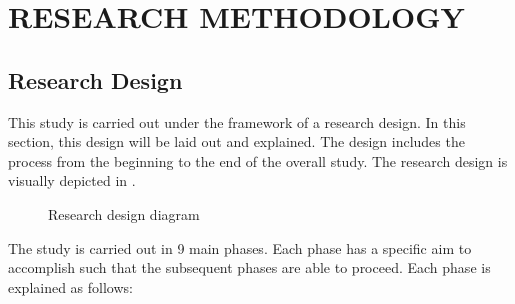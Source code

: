 \chapter{RESEARCH METHODOLOGY}\label{sec:research_methodology}


\section{Research Design}
\noindent This study is carried out under the framework of a research design. In this section, this design will be laid out and explained. The design includes the process from the beginning to the end of the overall study. The research design is visually depicted in .

\begin{figure}[H]
      \centering
      \caption{Research design diagram}\label{fig:research_design_diagram}
\end{figure}

The study is carried out in 9 main phases. Each phase has a specific aim to accomplish such that the subsequent phases are able to proceed. Each phase is explained as follows:

